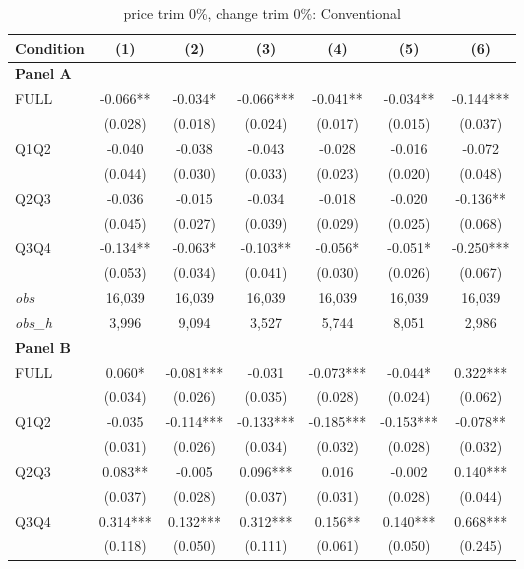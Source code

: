 \begin{table}[!htbp]
\centering
\caption{price trim 0\%, change trim 0\%: Conventional}
\label{tab:abc:trim00:conventional}
\small
\begin{tabular}{lcccccc}
\toprule
Condition & (1) & (2) & (3) & (4) & (5) & (6) \\
\midrule
\textbf{Panel A} &&&&&&  \\

FULL & -0.066** & -0.034* & -0.066*** & -0.041** & -0.034** & -0.144*** \\
 & (0.028) & (0.018) & (0.024) & (0.017) & (0.015) & (0.037) \\
Q1Q2 & -0.040 & -0.038 & -0.043 & -0.028 & -0.016 & -0.072 \\
 & (0.044) & (0.030) & (0.033) & (0.023) & (0.020) & (0.048) \\
Q2Q3 & -0.036 & -0.015 & -0.034 & -0.018 & -0.020 & -0.136** \\
 & (0.045) & (0.027) & (0.039) & (0.029) & (0.025) & (0.068) \\
Q3Q4 & -0.134** & -0.063* & -0.103** & -0.056* & -0.051* & -0.250*** \\
 & (0.053) & (0.034) & (0.041) & (0.030) & (0.026) & (0.067) \\

\textit{obs} & 16,039 & 16,039 & 16,039 & 16,039 & 16,039 & 16,039 \\
\textit{obs\_h} & 3,996 & 9,094 & 3,527 & 5,744 & 8,051 & 2,986 \\

\textbf{Panel B} &&&&&&  \\

FULL & 0.060* & -0.081*** & -0.031 & -0.073*** & -0.044* & 0.322*** \\
 & (0.034) & (0.026) & (0.035) & (0.028) & (0.024) & (0.062) \\
Q1Q2 & -0.035 & -0.114*** & -0.133*** & -0.185*** & -0.153*** & -0.078** \\
 & (0.031) & (0.026) & (0.034) & (0.032) & (0.028) & (0.032) \\
Q2Q3 & 0.083** & -0.005 & 0.096*** & 0.016 & -0.002 & 0.140*** \\
 & (0.037) & (0.028) & (0.037) & (0.031) & (0.028) & (0.044) \\
Q3Q4 & 0.314*** & 0.132*** & 0.312*** & 0.156** & 0.140*** & 0.668*** \\
 & (0.118) & (0.050) & (0.111) & (0.061) & (0.050) & (0.245) \\


\end{tabular}
\end{table}
